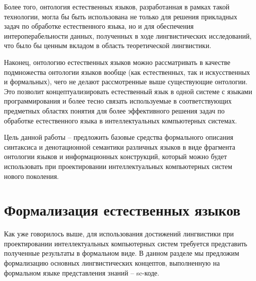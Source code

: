 Более того, онтология естественных языков, разработанная в рамках такой технологии, могла бы быть использована не только для решения прикладных задач по обработке естественного языка, но и для обеспечения интероперабельности данных, полученных в ходе лингвистических исследований, что было бы ценным вкладом в область теоретической лингвистики.

Наконец, онтологию естественных языков можно рассматривать в качестве подмножества онтологии языков вообще (как естественных, так и искусственных и формальных), чего не делают рассмотренные выше существующие онтологии. Это позволит концептуализировать естественный язык в одной системе с языками программирования и более тесно связать используемые в соответствующих предметных областях понятия для более эффективного решения задач по обработке естественного языка в интеллектуальных компьютерных системах.

Цель данной работы -- предложить базовые средства формального описания синтаксиса и денотационной семантики различных языков в виде фрагмента онтологии языков и информационных конструкций, который можно будет использовать при проектировании интеллектуальных компьютерных систем нового поколения.

\section{Формализация естественных языков}

Как уже говорилось выше, для использования достижений лингвистики при проектировании интеллектуальных компьютерных систем требуется представить полученные результаты в формальном виде. В данном разделе мы предложим формализацию основных лингвистических концептов, выполненную на формальном языке представления знаний -- sc-коде.

